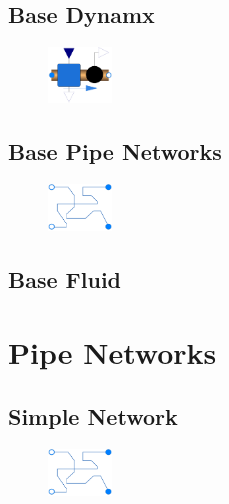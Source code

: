 \documentclass[we,final,11pt,oneside,openany]{uantwerpenbamathesis}
\begin{document}
\lipsum[67]

\subsection{Base Dynamx}
\label{subsec:base-dynamx}

\begin{figure}
    \centering
    \includegraphics[width=0.15\textwidth]{Images/components/dynamx}
\end{figure}

\lipsum[67]

\subsection{Base Pipe Networks}
\label{subsec:base-pipe-networks}

\begin{figure}
    \centering
    \includegraphics[width=0.15\textwidth]{Images/components/pipe-network}
\end{figure}

\lipsum[67]

\subsection{Base Fluid}
\label{subsec:base-fluid}

\lipsum[67]

\section{Pipe Networks}
\label{sec:pipe-networks}

\subsection{Simple Network}
\label{subsec:simple-network}

\begin{figure}
    \centering
    \includegraphics[width=0.15\textwidth]{Images/components/pipe-network}
\end{figure}
\end{document}
